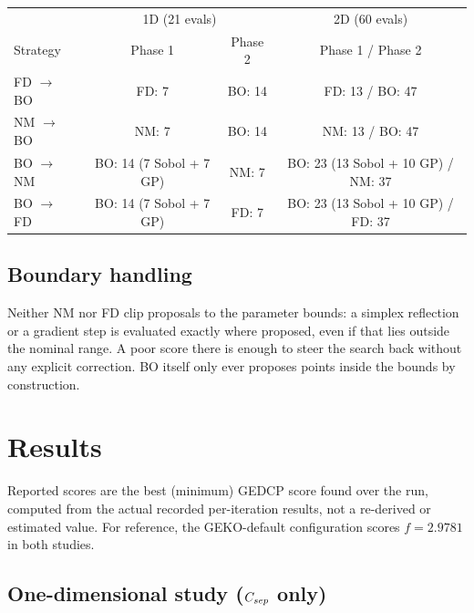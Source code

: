 \begin{center}
\begin{tabular}{@{}lccc@{}}
\toprule
& \multicolumn{2}{c}{1D (21 evals)} & 2D (60 evals) \\
Strategy & Phase 1 & Phase 2 & Phase 1 / Phase 2 \\
\midrule
FD $\to$ BO  & FD: 7           & BO: 14 & FD: 13 / BO: 47 \\
NM $\to$ BO  & NM: 7           & BO: 14 & NM: 13 / BO: 47 \\
BO $\to$ NM  & BO: 14 (7 Sobol + 7 GP) & NM: 7 & BO: 23 (13 Sobol + 10 GP) / NM: 37 \\
BO $\to$ FD  & BO: 14 (7 Sobol + 7 GP) & FD: 7 & BO: 23 (13 Sobol + 10 GP) / FD: 37 \\
\bottomrule
\end{tabular}
\end{center}

\subsection{Boundary handling}

Neither NM nor FD clip proposals to the parameter bounds: a simplex reflection or
a gradient step is evaluated exactly where proposed, even if that lies outside
the nominal range. A poor score there is enough to steer the search back without
any explicit correction. BO itself only ever proposes points inside the bounds by
construction.

\section{Results}
\label{sec:results}

Reported scores are the best (minimum) GEDCP score found over the run, computed
from the actual recorded per-iteration results, not a re-derived or estimated
value. For reference, the GEKO-default configuration scores $f=2.9781$ in both
studies.

\subsection{One-dimensional study ($C_{sep}$ only)}
\label{sec:results-1d}

